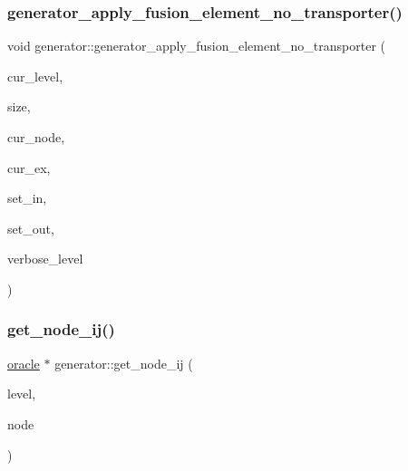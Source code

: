 \subsubsection{\texorpdfstring{generator\+\_\+apply\+\_\+fusion\+\_\+element\+\_\+no\+\_\+transporter()}{generator\_apply\_fusion\_element\_no\_transporter()}}
{\footnotesize\ttfamily void generator\+::generator\+\_\+apply\+\_\+fusion\+\_\+element\+\_\+no\+\_\+transporter (\begin{DoxyParamCaption}\item[{\mbox{\hyperlink{galois_8h_a09fddde158a3a20bd2dcadb609de11dc}{I\+NT}}}]{cur\+\_\+level,  }\item[{\mbox{\hyperlink{galois_8h_a09fddde158a3a20bd2dcadb609de11dc}{I\+NT}}}]{size,  }\item[{\mbox{\hyperlink{galois_8h_a09fddde158a3a20bd2dcadb609de11dc}{I\+NT}}}]{cur\+\_\+node,  }\item[{\mbox{\hyperlink{galois_8h_a09fddde158a3a20bd2dcadb609de11dc}{I\+NT}}}]{cur\+\_\+ex,  }\item[{\mbox{\hyperlink{galois_8h_a09fddde158a3a20bd2dcadb609de11dc}{I\+NT}} $\ast$}]{set\+\_\+in,  }\item[{\mbox{\hyperlink{galois_8h_a09fddde158a3a20bd2dcadb609de11dc}{I\+NT}} $\ast$}]{set\+\_\+out,  }\item[{\mbox{\hyperlink{galois_8h_a09fddde158a3a20bd2dcadb609de11dc}{I\+NT}}}]{verbose\+\_\+level }\end{DoxyParamCaption})}

\mbox{\label{classgenerator_a8cea5411b42336694738530732ede540}} 
\subsubsection{\texorpdfstring{get\+\_\+node\+\_\+ij()}{get\_node\_ij()}}
{\footnotesize\ttfamily \mbox{\hyperlink{classoracle}{oracle}} $\ast$ generator\+::get\+\_\+node\+\_\+ij (\begin{DoxyParamCaption}\item[{\mbox{\hyperlink{galois_8h_a09fddde158a3a20bd2dcadb609de11dc}{I\+NT}}}]{level,  }\item[{\mbox{\hyperlink{galois_8h_a09fddde158a3a20bd2dcadb609de11dc}{I\+NT}}}]{node }\end{DoxyParamCaption})}


